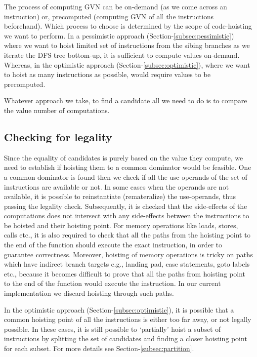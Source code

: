 \documentclass{sig-alternate}
\begin{document}
The process of computing GVN can be on-demand (as we come across an instruction)
or, precomputed (computing GVN of all the instructions beforehand). Which
process to choose is determined by the scope of code-hoisting we want to
perform. In a pessimistic approach (Section-\ref{subsec:pessimistic}) where we
want to hoist limited set of instructions from the sibing branches as we iterate
the DFS tree bottom-up, it is sufficient to compute values on-demand. Whereas,
in the optimistic approach (Section-\ref{subsec:optimistic}), where we want to
hoist as many instructions as possible, would require values to be precomputed.

Whatever approach we take, to find a candidate all we need to do is to compare
the value number of computations.

\subsection{Checking for legality}
\label{subsec:legality}
Since the equality of candidates is purely based on the value they compute, we
need to establish if hoisting them to a common dominator would be feasible. One
a common dominator is found then we check if all the use-operands of the set of
instructions are available or not. In some cases when the operands are not
available, it is possible to reinstantiate (remateralize) the use-operands, thus
passing the legality check. Subsequently, it is checked that the side-effects of
the computations does not intersect with any side-effects between the
instructions to be hoisted and their hoisting point. For memory operations like
loads, stores, calls etc., it is also required to check that all the paths from
the hoisting point to the end of the function should execute the exact
instruction, in order to guarantee correctness. Moreover, hoisting of memory
operations is tricky on paths which have indirect branch targets e.g., landing
pad, case statements, goto labels etc., because it becomes difficult to prove
that all the paths from hoisting point to the end of the function would execute
the instruction. In our current implementation we discard hoisting through such
paths.

In the optimistic approach (Section-\ref{subsec:optimistic}), it is possible
that a common hoisting point of all the instructions is either too far away, or
not legally possible. In these cases, it is still possible to `partially' hoist
a subset of instructions by splitting the set of candidates and finding a closer
hoisting point for each subset. For more details see
Section-\ref{subsec:partition}.
\end{document}
